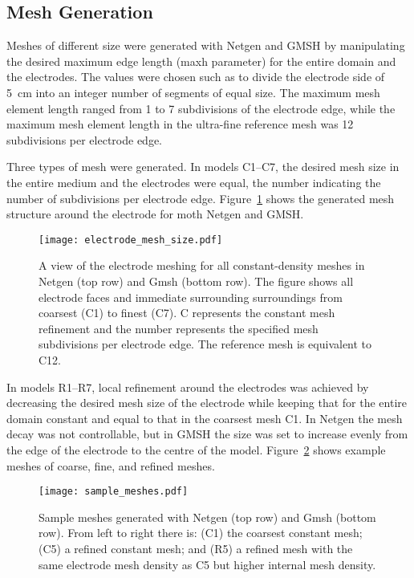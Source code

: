 \documentclass[12pt]{iopart}
\begin{document}
\subsection{Mesh Generation}
Meshes of different size were generated with Netgen and GMSH by manipulating the desired
maximum edge length (maxh parameter) for the entire domain and the electrodes.
The values were
chosen such as to divide the electrode side of 5~cm into an integer number of
segments of equal size. 
The maximum mesh element length ranged from 1 to 7 subdivisions of the electrode 
edge, while the maximum mesh element length in the ultra-fine reference mesh  
was 12 subdivisions per 
electrode edge. 

Three types of mesh were generated. In models C1--C7, the
desired mesh size in the entire medium and the electrodes were equal, the number
indicating the number of subdivisions per electrode edge. 
Figure~\ref{fig:electrode_mesh_size} shows the generated mesh structure around the electrode 
for moth Netgen and GMSH. 

\begin{figure}
  \texttt{[image: electrode\_mesh\_size.pdf]}
  \caption{\label{fig:electrode_mesh_size} A view of the electrode meshing for all constant-density meshes 
  in Netgen (top row) and Gmsh (bottom row). The figure shows all electrode faces and immediate surrounding
  surroundings from coarsest (C1) to finest (C7). C represents the constant mesh refinement and the number
  represents the specified mesh subdivisions per electrode edge. The reference mesh is equivalent to C12.}
\end{figure}

In models R1--R7, local refinement around the electrodes was achieved by
decreasing the desired mesh size of the electrode while keeping that for the
entire domain constant and equal to that in the coarsest mesh C1. 
In Netgen the mesh decay was not controllable, but in GMSH the size was set 
to increase evenly from the edge of the electrode to the centre of the model.
Figure~\ref{fig:sample_meshes} shows example meshes of coarse, fine, and refined
meshes.

\begin{figure}
   \texttt{[image: sample\_meshes.pdf]}
   \caption{\label{fig:sample_meshes} Sample meshes generated with Netgen (top row)
   and Gmsh (bottom row). From left to right there is: (C1) the coarsest constant
   mesh; (C5) a refined constant mesh; and (R5) a refined mesh with the same
   electrode mesh density as C5 but higher internal mesh density.}
\end{figure}
\end{document}
